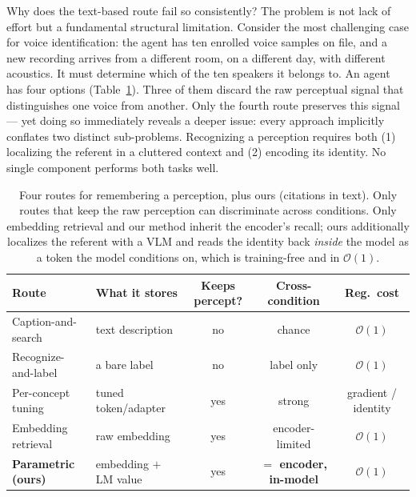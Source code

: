 Why does the text-based route fail so consistently? The problem is not lack of effort but a fundamental structural limitation. Consider the most challenging case for voice identification: the agent has ten enrolled voice samples on file, and a new recording arrives from a different room, on a different day, with different acoustics. It must determine which of the ten speakers it belongs to. An agent has four options (Table~\ref{tab:routes}). Three of them discard the raw perceptual signal that distinguishes one voice from another. Only the fourth route preserves this signal --- yet doing so immediately reveals a deeper issue: every approach implicitly conflates two distinct sub-problems. Recognizing a perception requires both (1) localizing the referent in a cluttered context and (2) encoding its identity. No single component performs both tasks well.

\begin{table}[h]
\footnotesize\centering
\caption{Four routes for remembering a perception, plus ours (citations in text). Only routes that keep the raw perception can discriminate across conditions. Only embedding retrieval and our method inherit the encoder's recall; ours additionally localizes the referent with a VLM and reads the identity back \emph{inside} the model as a token the model conditions on, which is training-free and in $\mathcal{O}(1)$.}
\label{tab:routes}
\setlength{\tabcolsep}{5pt}
\begin{tabular}{@{}llccc@{}}
\toprule
\textbf{Route} & \textbf{What it stores} & \textbf{Keeps percept?} & \textbf{Cross-condition} & \textbf{Reg.\ cost} \\
\midrule
Caption-and-search    & text description        & no  & chance        & $\mathcal{O}(1)$ \\
Recognize-and-label   & a bare label            & no  & label only    & $\mathcal{O}(1)$ \\
Per-concept tuning    & tuned token/adapter     & yes & strong        & gradient / identity \\
Embedding retrieval   & raw embedding           & yes & encoder-limited & $\mathcal{O}(1)$ \\
\textbf{Parametric (ours)} & embedding $+$ LM value & yes & \textbf{$=$ encoder, in-model} & $\mathcal{O}(1)$ \\
\bottomrule
\end{tabular}
\end{table}

